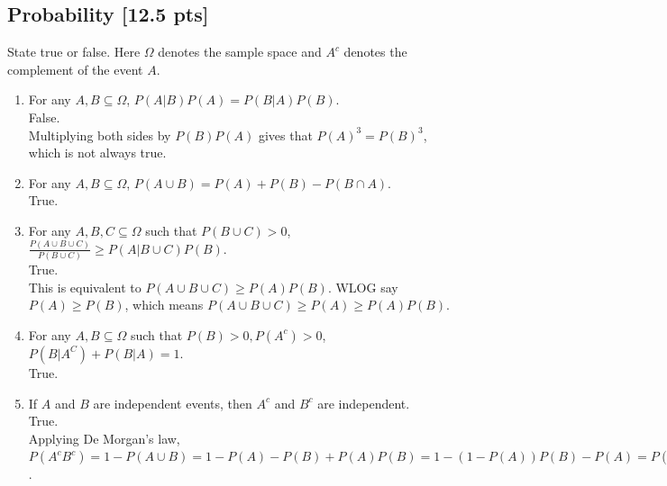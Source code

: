 \documentclass[a4paper]{article}
\theoremstyle{definition}
\newenvironment{soln}{
	\leavevmode\color{blue}\ignorespaces
}{}
\begin{document}
	\subsection{Probability [12.5 pts]}
	State true or false. Here $\Omega$ denotes the sample space and $A^c$ denotes the complement of the event $A$.
	\begin{enumerate}
		\item For any $A, B \subseteq \Omega$, $P(A|B)P(A) = P(B|A)P(B)$.\\
		\begin{soln} False. \\
			Multiplying both sides by $ P(B)P(A) $ gives that $ P(A)^3 = P(B)^3 $, which is not always true. \end{soln}
		
		\item For any $A, B \subseteq \Omega$, $P(A \cup B) = P(A) + P(B) - P(B \cap A)$.\\         
		\begin{soln}  True. \end{soln}
		
		\item For any $A, B, C \subseteq \Omega$ such that $P(B \cup C) > 0$,
		$\frac{P(A \cup B \cup C)}{P(B \cup C)} \geq P(A | B \cup C) P(B)$.\\ 
		\begin{soln}  True.\\
		This is equivalent to $ P(A\cup B \cup C) \geq P(A) P(B) $. WLOG say $ P(A)\geq P(B) $, which means $ P(A\cup B \cup C) \geq P(A) \geq P(A)P(B) $. \end{soln}
		
		\item For any $A, B\subseteq\Omega$ such that $P(B) > 0, P(A^c) > 0$,
		$P(B|A^C) + P(B|A) = 1$.\\ 
		\begin{soln}  True. \end{soln}
		
		\item If $A$ and $B$ are independent events, then $A^{c}$ and $B^{c}$ are independent.\\
		\begin{soln}  True.\\
		Applying De Morgan's law, $ P(A^cB^c) = 1-P(A\cup B) = 1-P(A)-P(B)+P(A)P(B) = 1-(1-P(A))P(B) - P(A) = P(A^c)-P(A^c)P(B) = P(A^c)P(B^c) $. \end{soln}
		
	\end{enumerate}
	
\end{document}
